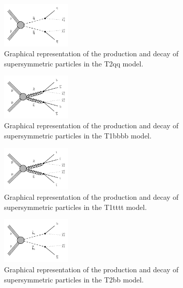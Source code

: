 \begin{figure} \begin{center}
    \includegraphics[width=0.3\textwidth]{Supplementary/T2qq_feyn_aux}
        \caption{
            Graphical representation of the production and decay of
            supersymmetric particles in the T2qq model.
        }
        \label{fig:simplified-models-feyn-T2qq}
\end{center} \end{figure}

\begin{figure}[h!] \begin{center}
    \includegraphics[width=0.3\textwidth]{Supplementary/T1bbbb_feyn_aux}
        \caption{
            Graphical representation of the production and decay of
            supersymmetric particles in the T1bbbb model.
        }
        \label{fig:simplified-models-feyn-T1bbbb}
\end{center} \end{figure}

\begin{figure}[h!] \begin{center}
    \includegraphics[width=0.3\textwidth]{Supplementary/T1tttt_feyn_aux}
        \caption{
            Graphical representation of the production and decay of
            supersymmetric particles in the T1tttt model.
        }
        \label{fig:simplified-models-feyn-T1tttt}
\end{center} \end{figure}

\begin{figure}[h!] \begin{center}
    \includegraphics[width=0.3\textwidth]{Supplementary/T2bb_feyn_aux}
        \caption{
            Graphical representation of the production and decay of
            supersymmetric particles in the T2bb model.
        }
        \label{fig:simplified-models-feyn-T2bb}
\end{center} \end{figure}

